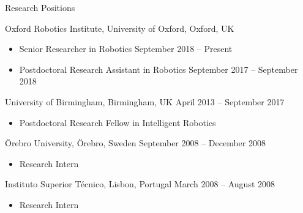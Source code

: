 
\begin{rSection}{Research Positions}

\item Oxford Robotics Institute, University of Oxford, Oxford, UK
\begin{itemize}
\item Senior Researcher in Robotics \hfill September 2018 -- Present 
\item Postdoctoral Research Assistant in Robotics \hfill September 2017 -- September 2018 
\end{itemize}

\item University of Birmingham, Birmingham, UK \hfill April 2013 -- September 2017
\begin{itemize}
\item Postdoctoral Research Fellow in Intelligent Robotics 
\end{itemize}

\item \"Orebro University, \"Orebro, Sweden \hfill September 2008 -- December 2008
\begin{itemize}
\item Research Intern 
\end{itemize}

\item Instituto Superior T\'ecnico, Lisbon, Portugal \hfill March 2008 -- August 2008
\begin{itemize}
\item Research Intern 
\end{itemize}


\end{rSection}
